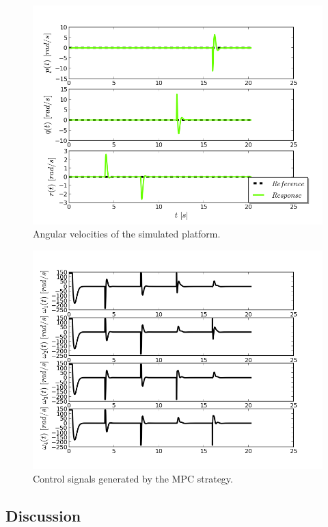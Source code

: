 \begin{figure}[H]
\centering
\includegraphics[scale=0.7]{Images/Chapter5/ardrone/ang_velocity_control.png}
\caption{Angular velocities of the simulated platform.}
\label{fig:ardrone_ang_vel}
\end{figure}

\begin{figure}[H]
\centering
\includegraphics[scale=0.7]{Images/Chapter5/ardrone/control_signals.png}
\caption{Control signals generated by the MPC strategy.}
\label{fig:ardrone_inputs}
\end{figure}

\subsection{Discussion}

